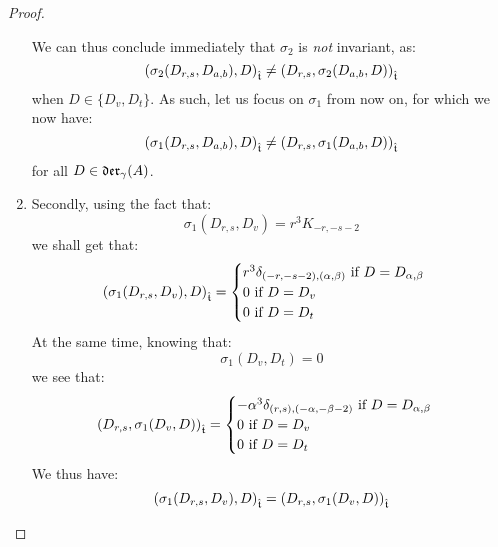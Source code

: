 \begin{proof}
\begin{enumerate}
                    We can thus conclude immediately that $\sigma_2$ is \textit{not} invariant, as:
                        $$\left( \sigma_2(D_{r, s}, D_{a, b}), D \right)_{\hat{\mathfrak{t}}} \not = \left( D_{r, s}, \sigma_2(D_{a, b}, D) \right)_{\hat{\mathfrak{t}}}$$
                    when $D \in \{D_v, D_t\}$. As such, let us focus on $\sigma_1$ from now on, for which we now have:
                        $$\left( \sigma_1(D_{r, s}, D_{a, b}), D \right)_{\hat{\mathfrak{t}}} \not = \left( D_{r, s}, \sigma_1(D_{a, b}, D) \right)_{\hat{\mathfrak{t}}}$$
                    for all $D \in \mathfrak{der}_{\gamma}(A)$.
                    \item Secondly, using the fact that:
                        $$\sigma_1(D_{r, s}, D_v) = r^3 K_{-r, -s - 2}$$
                    we shall get that:
                        $$
                            \left( \sigma_1(D_{r, s}, D_v), D \right)_{\hat{\mathfrak{t}}} =
                            \begin{cases}
                                \text{$r^3 \delta_{(-r, -s - 2), (\alpha, \beta)}$ if $D = D_{\alpha, \beta}$}
                                \\
                                \text{$0$ if $D = D_v$}
                                \\
                                \text{$0$ if $D = D_t$}
                            \end{cases}
                        $$
                    At the same time, knowing that:
                        $$\sigma_1(D_v, D_t) = 0$$
                    we see that:
                        $$
                            \begin{aligned}
                                \left( D_{r, s}, \sigma_1(D_v, D) \right)_{\hat{\mathfrak{t}}} =
                                \begin{cases}
                                    \text{$-\alpha^3 \delta_{(r, s), (-\alpha, -\beta - 2)}$ if $D = D_{\alpha, \beta}$}
                                    \\
                                    \text{$0$ if $D = D_v$}
                                    \\
                                    \text{$0$ if $D = D_t$}
                                \end{cases}
                            \end{aligned}
                        $$
                    We thus have:
                        $$\left( \sigma_1(D_{r, s}, D_v), D \right)_{\hat{\mathfrak{t}}} = \left( D_{r, s}, \sigma_1(D_v, D) \right)_{\hat{\mathfrak{t}}}$$

\end{enumerate}
\end{proof}
